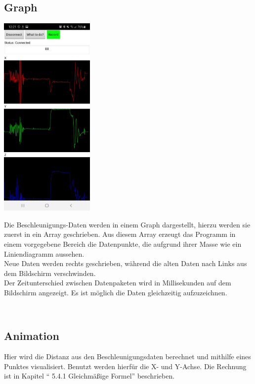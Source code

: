 \subsection{Graph}
   \begin{minipage}{0.5\textwidth}
        \includegraphics[height=10cm]{Bilder/Graph.jpg}
    \end{minipage}
    \hfill
    \begin{minipage}{0.5\textwidth}
        Die Beschleunigungs-Daten werden in einem Graph dargestellt, hierzu werden sie zuerst in ein
        Array geschrieben. Aus diesem Array erzeugt das Programm in einem vorgegebene Bereich
        die Datenpunkte, die aufgrund ihrer Masse wie ein Liniendiagramm aussehen.\\
        Neue Daten werden rechts geschrieben, während die alten Daten nach Links aus dem
        Bildschirm verschwinden.\\
        Der Zeitunterschied zwischen Datenpaketen wird in Millisekunden auf dem Bildschirm
        angezeigt.
        Es ist möglich die Daten gleichzeitig aufzuzeichnen.\\
    \end{minipage}
\\

\subsection{Animation}
Hier wird die Distanz aus den Beschleunigungsdaten berechnet und mithilfe eines Punktes
visualisiert. Benutzt werden hierfür die X- und Y-Achse. 
Die Rechnung ist in Kapitel `` 5.4.1 Gleichmäßige Formel'' beschrieben.


